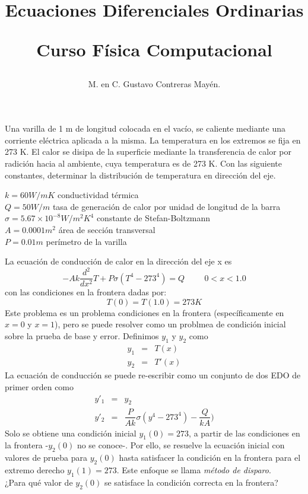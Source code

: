 \documentclass[12pt]{article}
\author{M. en C. Gustavo Contreras Mayén.}
\title{Ecuaciones Diferenciales Ordinarias \\ \begin{large}Curso Física Computacional\end{large}}
\date{ }
\begin{document}
\maketitle
Una varilla de 1 m de longitud colocada en el vacío, se caliente mediante una corriente eléctrica aplicada a la misma. La temperatura en los extremos se fija en 273 K. El calor se disipa de la superficie mediante la transferencia de calor por radición hacia al ambiente, cuya temperatura es de 273 K. Con las siguiente constantes, determinar la distribución de temperatura en dirección del eje.
\begin{description}
\item[$ k= 60 W/mK$ conductividad térmica]
\item[$Q=50 W/m$ tasa de generación de calor por unidad de longitud de la barra]
\item[$\sigma = 5.67 \times 10^{-8} W/m^{2}K^{4}$ constante de Stefan-Boltzmann]
\item[$A=0.0001 m^{2}$ área de sección transversal]
\item[$P=0.01 m$ perímetro de la varilla]
\end{description}
La ecuación de conducción de calor en la dirección del eje x es
\[ -Ak \dfrac{d^{2}}{dx^{2}} T + P \sigma (T^{4}-273^{4})=Q \hspace{1cm} 0<x<1.0 \]
con las condiciones en la frontera dadas por:
\[ T(0) = T(1.0) = 273 K \]
Este problema es un problema condiciones en la frontera (específicamente en $x=0$ y $x=1$), pero se puede resolver como un problmea de condición inicial sobre la prueba de base y error. Definimos $y_{1}$ y $y_{2}$ como
\begin{eqnarray*}
y_{1} & = & T(x) \\
y_{2} & = & T'(x) 
\end{eqnarray*}
La ecuación de conducción se puede re-escribir como un conjunto de dos EDO de primer orden como
\begin{eqnarray*}
y'_{1} & = & y_{2} \\
y'_{2} & = & \dfrac{P}{Ak} \sigma (y^{4} - 273^{4}) - \dfrac{Q}{kA})
\end{eqnarray*}
Solo se obtiene una condición inicial $y_{1}(0)=273$, a partir de las condiciones en la frontera -$y_{2}(0)$ no se conoce-. Por ello, se resuelve la ecuación inicial con valores de prueba para $y_{2}(0)$ hasta satisfacer la condición en la frontera para el extremo derecho $y_{1}(1) = 273$. Este enfoque se llama \textit{método de disparo}.
\\¿Para qué valor de $y_{2}(0)$ se satisface la condición correcta en la frontera?
\end{document}
